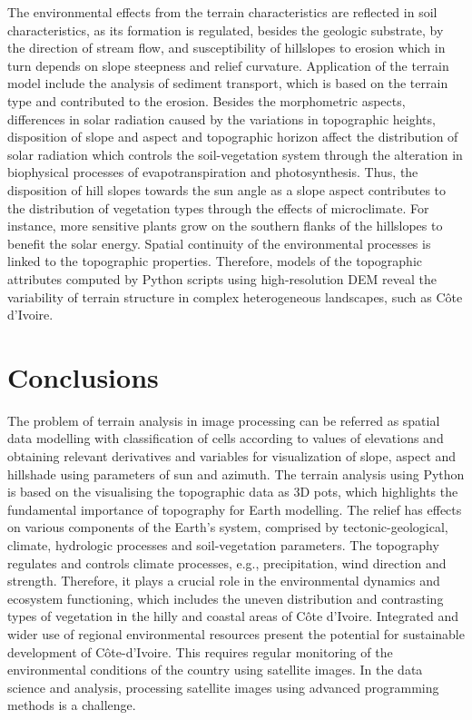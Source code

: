 \documentclass[algorithms,article,submit,pdftex,moreauthors]{Definitions/mdpi}
\begin{document}
The environmental effects from the terrain characteristics are reflected in soil characteristics, as its formation is regulated, besides the geologic substrate, by the direction of stream flow, and susceptibility of hillslopes to erosion which in turn depends on slope steepness and relief curvature. Application of the terrain model include the analysis of sediment transport, which is based on the terrain type and contributed to the erosion. Besides the morphometric aspects, differences in solar radiation caused by the variations in topographic heights, disposition of slope and aspect and topographic horizon affect the distribution of solar radiation which controls the soil-vegetation system through the alteration in biophysical processes of evapotranspiration and photosynthesis. Thus, the disposition of hill slopes towards the sun angle as a slope aspect contributes to the distribution of vegetation types through the effects of microclimate. For instance, more sensitive plants grow on the southern flanks of the hillslopes to benefit the solar energy. Spatial continuity of the environmental processes is linked to the topographic properties. Therefore, models of the topographic attributes computed by Python scripts using high-resolution DEM reveal the variability of terrain structure in complex heterogeneous landscapes, such as Côte d'Ivoire.

\section{Conclusions}
The problem of terrain analysis in image processing can be referred as spatial data modelling with classification of cells according to values of elevations and obtaining relevant derivatives and variables for visualization of slope, aspect and hillshade using parameters of sun and azimuth. The terrain analysis using Python is based on the visualising the topographic data as 3D pots, which highlights the fundamental importance of topography for Earth modelling. The relief has effects on various components of the Earth’s system, comprised by tectonic-geological, climate, hydrologic processes and soil-vegetation parameters. The topography regulates and controls climate processes, e.g., precipitation, wind direction and strength. Therefore, it plays a crucial role in the environmental dynamics and ecosystem functioning, which includes the uneven distribution and contrasting types of vegetation in the hilly and coastal areas of Côte d'Ivoire. Integrated and wider use of regional environmental resources present the potential for sustainable development of Côte-d'Ivoire. This requires regular monitoring of the environmental conditions of the country using satellite images. In the data science and analysis, processing satellite images using advanced programming methods is a challenge. 
\end{document}
